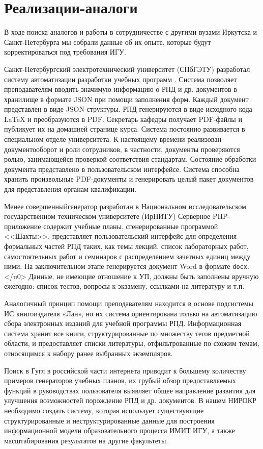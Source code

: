 \documentclass[
]{aiitart}
\begin{document}
\section{Реализации-аналоги}

В ходе поиска аналогов и работы в сотрудничестве с другими вузами Иркутска и Санкт-Петербурга мы собрали данные об их опыте, которые будут корректироваться под требования ИГУ.

Санкт-Петербургский электротехнический университет (СПбГЭТУ) разработал систему автоматизации разработки учебных программ \cite{leti}. Система позволяет преподавателям вводить значимую информацию о РПД и др. документов в хранилище в формате JSON при помощи заполнения форм. Каждый документ представлен в виде JSON-структуры. РПД генерируются в виде исходного кода \LaTeX{} и преобразуются в PDF. Секретарь кафедры получает PDF-файлы и публикует их на домашней странице курса. Система постоянно развивается в специальном отделе университета. К настоящему времени реализован документооборот и роли сотрудников, в частности, документы проверяются ролью, занимающейся проверкой соответствия стандартам. Состояние обработки документа представлено в пользовательском интерфейсе. Система способна хранить произвольные PDF-документы и генерировать целый пакет документов для представления органам квалификации.

Менее совершенныйгенератор разработан в Национальном исследовательском государственном техническом университете (ИрНИТУ) \cite{nrtu} Серверное PHP-приложение содержит учебные планы, сгенерированные программой <<Шахты>>, представляет пользовательский интерфейс для определения формальных частей РПД таких, как темы лекций, список лабораторных работ, самостоятельных работ и семинаров с распределением зачетных единиц между ними. На заключительном этапе генерируется документ Word в формате \verb|docx|.</u0> Данные, не имеющие отношение к УП, должны быть заполнены вручную ежегодно: список тестов, вопросы к экзамену, ссылками на литературу и т.п.

Аналогичный принцип помощи преподавателям находится в основе подсистемы ИС книгоиздателя «Лан», но их система ориентирована только на автоматизацию сбора электронных изданий для учебной программы РПД. Информационная система хранит все книги, структурированные по множеству тегов предметной области, и предоставляет списки литературы, отфильтрованные по схожим темам, относящимся к набору ранее выбранных экземпляров.

Поиск в Гугл в российской части интернета приводит к большему количеству примеров генераторов учебных планов, их грубый обзор предоставляемых функций в руководствах пользователя выявляет общее направление развития для улучшения возможностей порождение РПД и др. документов. В нашем НИРОКР необходимо создать систему, которая использует существующие структурированные и неструктурированные данные для построения информационной модели образовательного процесса ИМИТ ИГУ, а также масштабирования результатов на другие факультеты.
\end{document}
